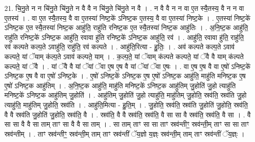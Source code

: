 \documentclass[17pt]{extarticle}
\begin{document}
21. चि॒नु॒ते न न चि॑नु॒ते चि॑नु॒ते न वै वै न चि॑नु॒ते चि॑नु॒ते न वै । . न वै वै न न वा ए॒त स्यै॒तस्य॒ वै न न वा ए॒तस्य॑ । . वा ए॒त स्यै॒तस्य॒ वै वा ए॒तस्या॑ निष्ट॒के॑ ऽनिष्ट॒क ए॒तस्य॒ वै वा ए॒तस्या॑ निष्ट॒के । . ए॒तस्या॑ निष्ट॒के॑ ऽनिष्ट॒क ए॒त स्यै॒तस्या॑ निष्ट॒क आहु॑ति॒ राहु॑ति रनिष्ट॒क ए॒त स्यै॒तस्या॑ निष्ट॒क आहु॑तिः । . अ॒नि॒ष्ट॒क आहु॑ति॒ राहु॑ति रनिष्ट॒के॑ ऽनिष्ट॒क आहु॑ति॒ रवावा हु॑ति रनिष्ट॒के॑ ऽनिष्ट॒क आहु॑ति॒ रव॑ । . आहु॑ति॒ रवावा हु॑ति॒ राहु॑ति॒ रव॑ कल्पते कल्प॒ते ऽवाहु॑ति॒ राहु॑ति॒ रव॑ कल्पते । . आहु॑ति॒रित्या - हु॒तिः॒ । . अव॑ कल्पते कल्प॒ते ऽवाव॑ कल्पते॒ यां ॅयाम् क॑ल्प॒ते ऽवाव॑ कल्पते॒ याम् । . क॒ल्प॒ते॒ यां ॅयाम् क॑ल्पते कल्पते॒ यां ॅवै वै याम् क॑ल्पते कल्पते॒ यां ॅवै । . यां ॅवै वै यां ॅयां ॅवा ए॒ष ए॒ष वै यां ॅयां ॅवा ए॒षः । . वा ए॒ष ए॒ष वै वा ए॒षो॑ ऽनिष्ट॒के॑ ऽनिष्ट॒क ए॒ष वै वा ए॒षो॑ ऽनिष्ट॒के । . ए॒षो॑ ऽनिष्ट॒के॑ ऽनिष्ट॒क ए॒ष ए॒षो॑ ऽनिष्ट॒क आहु॑ति॒ माहु॑ति मनिष्ट॒क ए॒ष ए॒षो॑ ऽनिष्ट॒क आहु॑तिम् । . अ॒नि॒ष्ट॒क आहु॑ति॒ माहु॑ति मनिष्ट॒के॑ ऽनिष्ट॒क आहु॑तिम् जु॒होति॑ जु॒हो त्याहु॑ति मनिष्ट॒के॑ ऽनिष्ट॒क आहु॑तिम् जु॒होति॑ । . आहु॑तिम् जु॒होति॑ जु॒हो त्याहु॑ति॒ माहु॑तिम् जु॒होति॒ स्रव॑ति॒ स्रव॑ति जु॒हो त्याहु॑ति॒ माहु॑तिम् जु॒होति॒ स्रव॑ति । . आहु॑ति॒मित्या - हु॒ति॒म् । . जु॒होति॒ स्रव॑ति॒ स्रव॑ति जु॒होति॑ जु॒होति॒ स्रव॑ति॒ वै वै स्रव॑ति जु॒होति॑ जु॒होति॒ स्रव॑ति॒ वै । . स्रव॑ति॒ वै वै स्रव॑ति॒ स्रव॑ति॒ वै सा सा वै स्रव॑ति॒ स्रव॑ति॒ वै सा । . वै सा सा वै वै सा ताम् ताꣳ सा वै वै सा ताम् । . सा ताम् ताꣳ सा सा ताꣳ स्रव॑न्तीꣳ॒॒ स्रव॑न्ती॒म् ताꣳ सा सा ताꣳ स्रव॑न्तीम् । . ताꣳ स्रव॑न्तीꣳ॒॒ स्रव॑न्ती॒म् ताम् ताꣳ स्रव॑न्तीं ॅय॒ज्ञो य॒ज्ञ्ः स्रव॑न्ती॒म् ताम् ताꣳ स्रव॑न्तीं ॅय॒ज्ञ्ः । \newline
\end{document}
